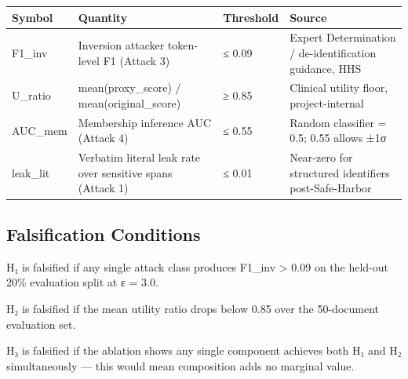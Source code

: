 {\def\LTcaptype{none} %
\begin{longtable}[]{@{}
  >{\raggedright\arraybackslash}p{}
  >{\raggedright\arraybackslash}p{}
  >{\raggedright\arraybackslash}p{}
  >{\raggedright\arraybackslash}p{}@{}}
\toprule\noalign{}
\begin{minipage}[b]{\linewidth}\raggedright
Symbol
\end{minipage} & \begin{minipage}[b]{\linewidth}\raggedright
Quantity
\end{minipage} & \begin{minipage}[b]{\linewidth}\raggedright
Threshold
\end{minipage} & \begin{minipage}[b]{\linewidth}\raggedright
Source
\end{minipage} \\
\midrule\noalign{}
\endhead
\bottomrule\noalign{}
\endlastfoot
F1\_inv & Inversion attacker token-level F1 (Attack 3) & ≤ 0.09 & Expert
Determination / de-identification guidance, HHS \\
U\_ratio & mean(proxy\_score) / mean(original\_score) & ≥ 0.85 &
Clinical utility floor, project-internal \\
AUC\_mem & Membership inference AUC (Attack 4) & ≤ 0.55 & Random
classifier = 0.5; 0.55 allows ±1σ \\
leak\_lit & Verbatim literal leak rate over sensitive spans (Attack 1) &
≤ 0.01 & Near-zero for structured identifiers post-Safe-Harbor \\
\end{longtable}
}

\subsection{Falsification Conditions}\label{falsification-conditions}

H₁ is falsified if any single attack class produces F1\_inv
\textgreater{} 0.09 on the held-out 20\% evaluation split at ε = 3.0.

H₂ is falsified if the mean utility ratio drops below 0.85 over the
50-document evaluation set.

H₃ is falsified if the ablation shows any single component achieves both
H₁ and H₂ simultaneously --- this would mean composition adds no
marginal value.

